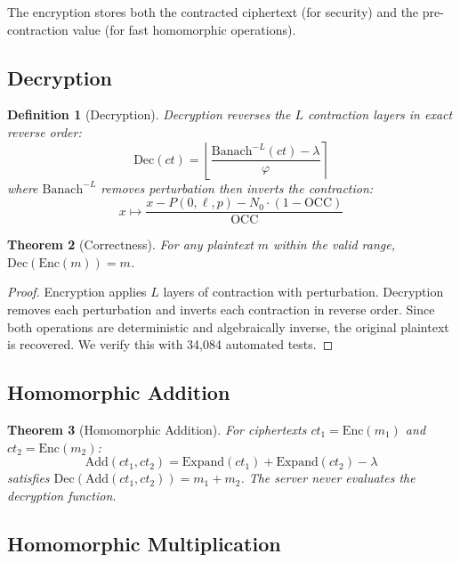 \documentclass[11pt,a4paper]{article}
\newtheorem{theorem}{Theorem}[section]
\newtheorem{definition}[theorem]{Definition}
\begin{document}
The encryption stores both the contracted ciphertext (for security) and the pre-contraction value (for fast homomorphic operations).

\subsection{Decryption}

\begin{definition}[Decryption]
Decryption reverses the $L$ contraction layers in exact reverse order:
\begin{equation}
    \text{Dec}(ct) = \left\lfloor \frac{\text{Banach}^{-L}(ct) - \lambda}{\varphi} \right\rceil
\end{equation}
where $\text{Banach}^{-L}$ removes perturbation then inverts the contraction:
\begin{equation}
    x \mapsto \frac{x - P(0, \ell, p) - N_0 \cdot (1 - \text{OCC})}{\text{OCC}}
\end{equation}
\end{definition}

\begin{theorem}[Correctness]
For any plaintext $m$ within the valid range, $\text{Dec}(\text{Enc}(m)) = m$.
\end{theorem}

\begin{proof}
Encryption applies $L$ layers of contraction with perturbation. Decryption removes each perturbation and inverts each contraction in reverse order. Since both operations are deterministic and algebraically inverse, the original plaintext is recovered. We verify this with 34,084 automated tests.
\end{proof}

\subsection{Homomorphic Addition}

\begin{theorem}[Homomorphic Addition]
For ciphertexts $ct_1 = \text{Enc}(m_1)$ and $ct_2 = \text{Enc}(m_2)$:
\begin{equation}
    \text{Add}(ct_1, ct_2) = \text{Expand}(ct_1) + \text{Expand}(ct_2) - \lambda
\end{equation}
satisfies $\text{Dec}(\text{Add}(ct_1, ct_2)) = m_1 + m_2$. The server never evaluates the decryption function.
\end{theorem}

\subsection{Homomorphic Multiplication}
\end{document}
